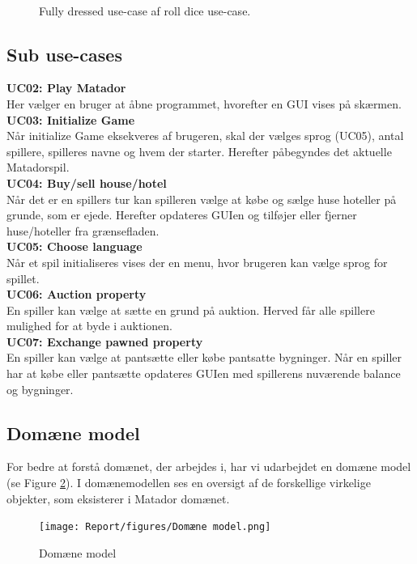 \begin{flushleft}
\begin{figure}[htp]
\begin{tabular}{ |c|c|c|c|c|c|  }
    \end{tabular}\\
    \caption{Fully dressed use-case af roll dice use-case.}
    \label{fully-dressed}
\end{figure}
\doublespacing

\subsection{Sub use-cases}
\textbf{UC02: Play Matador} \\
Her vælger en bruger at åbne programmet, hvorefter en GUI vises på skærmen.  \\
\textbf{UC03: Initialize Game} \\
Når initialize Game eksekveres af brugeren, skal der vælges sprog (UC05), antal spillere, spilleres navne og hvem der starter. Herefter påbegyndes det aktuelle Matadorspil.\\
\textbf{UC04: Buy/sell house/hotel} \\
Når det er en spillers tur kan spilleren vælge at købe og sælge huse hoteller på grunde, som er ejede. Herefter opdateres GUIen og tilføjer eller fjerner huse/hoteller fra grænsefladen.\\
\textbf{UC05: Choose language} \\
Når et spil initialiseres vises der en menu, hvor brugeren kan vælge sprog for spillet.\\
\textbf{UC06: Auction property} \\
En spiller kan vælge at sætte en grund på auktion. Herved får alle spillere mulighed for at byde i auktionen.\\
\textbf{UC07: Exchange pawned property} \\
En spiller kan vælge at pantsætte eller købe pantsatte bygninger. Når en spiller har at købe eller pantsætte opdateres GUIen med spillerens nuværende balance og bygninger.

\subsection{Domæne model}
For bedre at forstå domænet, der arbejdes i, har vi udarbejdet en domæne model (se Figure \ref{Domænemodel}). I domænemodellen ses en oversigt af de forskellige virkelige objekter, som eksisterer i Matador domænet.
\begin{figure}[H]
    \centering
    \texttt{[image: Report/figures/Domæne model.png]}
    \caption{Domæne model}
    \label{Domænemodel}
\end{figure}


\end{flushleft}
